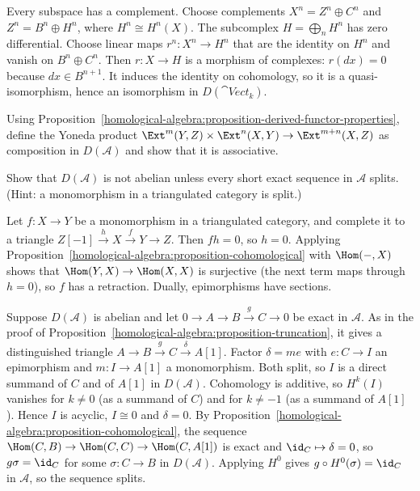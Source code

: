 \begin{solution}
Every subspace has a complement. Choose complements $X^n = Z^n \oplus C^n$ and $Z^n = B^n \oplus H^n$, where $H^n \cong H^n(X)$. The subcomplex
$H = \bigoplus_n H^n$ has zero differential. Choose linear maps $r^n \colon X^n \to H^n$ that are the identity on $H^n$ and vanish on $B^n \oplus C^n$. Then
$r \colon X \to H$ is a morphism of complexes: $r(dx) = 0$ because $dx \in B^{n+1}$. It induces the identity on cohomology, so it is a
quasi-isomorphism, hence an isomorphism in $D(\cat{Vect}_k)$.
\end{solution}

\begin{exercise}\label{homological-algebra:exercise-ext-composition}
Using Proposition~\ref{homological-algebra:proposition-derived-functor-properties}, define the Yoneda product
$\Ext^m(Y, Z) \times \Ext^n(X, Y) \to \Ext^{m+n}(X, Z)$ as composition in $D(\mathcal{A})$ and show that it is associative.
\end{exercise}

\begin{exercise}\label{homological-algebra:exercise-not-abelian}
Show that $D(\mathcal{A})$ is not abelian unless every short exact sequence in $\mathcal{A}$ splits. (Hint: a monomorphism in a triangulated category
is split.)
\end{exercise}

\begin{solution}
Let $f \colon X \to Y$ be a monomorphism in a triangulated category, and complete it to a triangle $Z[-1] \xrightarrow{h} X \xrightarrow{f} Y \to Z$. Then
$fh = 0$, so $h = 0$. Applying Proposition~\ref{homological-algebra:proposition-cohomological} with $\Hom(-, X)$ shows that
$\Hom(Y, X) \to \Hom(X, X)$ is surjective (the next term maps through $h = 0$), so $f$ has a retraction. Dually, epimorphisms have sections.

Suppose $D(\mathcal{A})$ is abelian and let $0 \to A \to B \xrightarrow{g} C \to 0$ be exact in $\mathcal{A}$. As in the proof of
Proposition~\ref{homological-algebra:proposition-truncation}, it gives a distinguished triangle $A \to B \xrightarrow{g} C \xrightarrow{\delta} A[1]$.
Factor $\delta = me$ with $e \colon C \to I$ an epimorphism and $m \colon I \to A[1]$ a monomorphism. Both split, so $I$ is a direct summand of $C$ and of
$A[1]$ in $D(\mathcal{A})$. Cohomology is additive, so $H^k(I)$ vanishes for $k \neq 0$ (as a summand of $C$) and for $k \neq -1$ (as a summand of $A[1]$).
Hence $I$ is acyclic, $I \cong 0$ and $\delta = 0$. By Proposition~\ref{homological-algebra:proposition-cohomological}, the sequence
$\Hom(C, B) \to \Hom(C, C) \to \Hom(C, A[1])$ is exact and $\id_C \mapsto \delta = 0$, so $g\sigma = \id_C$ for some $\sigma \colon C \to B$ in
$D(\mathcal{A})$. Applying $H^0$ gives $g \circ H^0(\sigma) = \id_C$ in $\mathcal{A}$, so the sequence splits.
\end{solution}
